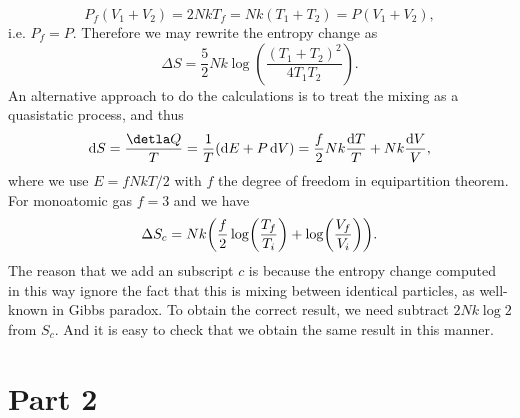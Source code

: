 \documentclass[10pt]{article}
\begin{document}
\begin{equation}
	P_f (V_1 + V_2) = 2N k T_f = Nk (T_1 + T_2) = P(V_1 + V_2),
\end{equation}
i.e. $P_f = P$. Therefore we may rewrite the entropy change as
\begin{equation}
	\Delta S = \frac{5}{2}Nk \log(\frac{(T_1 + T_2)^2}{4T_1 T_2}).
\end{equation}
An alternative approach to do the calculations is to treat the mixing as a quasistatic process, and thus 
\begin{equation}
	\dd{S} = \frac{\detla Q}{T} = \frac{1}{T} (\dd{E} + P \dd{V}) = \frac{f}{2}Nk \frac{\dd{T}}{T} + Nk \frac{\dd{V}}{V},
\end{equation}
where we use $E = f NkT / 2$ with  $f$ the degree of freedom in equipartition theorem. For monoatomic gas $f = 3$ and we have 
\begin{equation}
	\Delta S_c = Nk \qty(\frac{f}{2} \log(\frac{T_f}{T_i}) + \log(\frac{V_f}{V_i})).
\end{equation}
The reason that we add an subscript $c$ is because the entropy change computed in this way ignore the fact that this is mixing between identical particles, as well-known in Gibbs paradox. To obtain the correct result, we need subtract $2N k \log2$ from $S_c$. And it is easy to check that we obtain the same result in this manner.
\section{Part 2}
\end{document}
